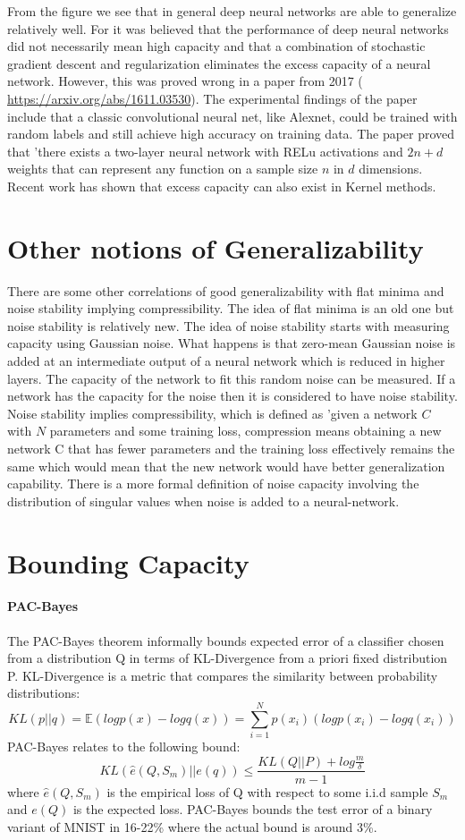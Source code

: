 From the figure we see that in general deep neural networks are able to generalize relatively well. For it was believed that the performance of deep neural networks did not necessarily mean high capacity and that a combination of stochastic gradient descent and regularization eliminates the excess capacity of a neural network. However, this was proved wrong in a paper from 2017 ( \url{https://arxiv.org/abs/1611.03530}). The experimental findings of the paper include that a classic convolutional neural net, like Alexnet, could be trained with random labels and still achieve high accuracy on training data. The paper proved that 'there exists a two-layer neural network with RELu activations and $2n+d$ weights that can represent any function on a sample size $n$ in $d$ dimensions. Recent work has shown that excess capacity can also exist in Kernel methods.

\section{Other notions of Generalizability}
There are some other correlations of good generalizability with flat minima and noise stability implying compressibility. The idea of flat minima is an old one but noise stability is relatively new. The idea of noise stability starts with measuring capacity using Gaussian noise. What happens is that zero-mean Gaussian noise is added at an intermediate output of a neural network which is reduced in higher layers. The capacity of the network to fit this random noise can be measured. If a network has the capacity for the noise then it is considered to have noise stability. Noise stability implies compressibility, which is defined as 'given a network $C$ with $N$ parameters and some training loss, compression means obtaining a new network C that has fewer parameters and the training loss effectively remains the same which would mean that the new network would have better generalization capability. There is a more formal definition of noise capacity involving the distribution of singular values when noise is added to a neural-network.

\section{Bounding Capacity}
\paragraph{PAC-Bayes}
The PAC-Bayes theorem informally bounds expected error of a classifier chosen from a distribution Q in terms of KL-Divergence from a priori fixed distribution P. KL-Divergence is a metric that compares the similarity between probability distributions:
\[
KL(p || q) = \mathbb{E}(log p(x) - log q(x)) = \sum_{i=1}^{N} p(x_i)(log p(x_i) - log q(x_i))
\]
PAC-Bayes relates to the following bound:
\[
KL(\hat{e}(Q,S_m) || e(q)) \leq \frac{KL (Q || P) + log \frac{m}{\delta}}{m-1}
\]
where $\hat{e}(Q,S_m)$ is the empirical loss of Q with respect to some i.i.d sample $S_m$ and $e(Q)$ is the expected loss. PAC-Bayes bounds the test error of a binary variant of MNIST in 16-22\% where the actual bound is around 3\%.

